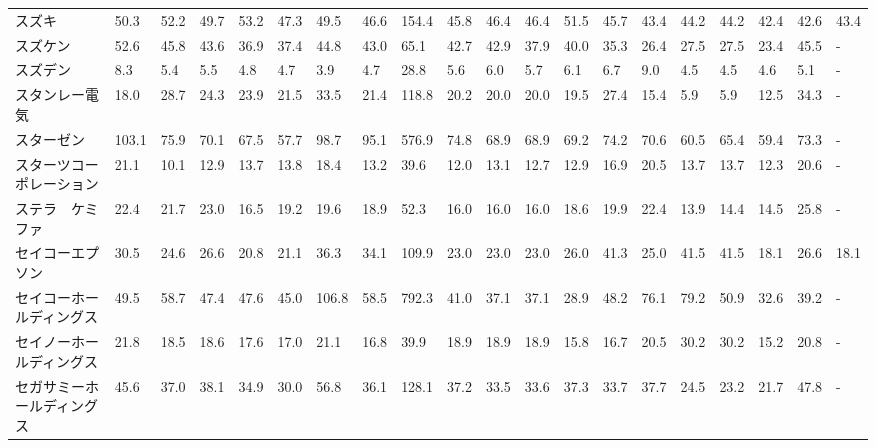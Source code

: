 \begin{longtable}[c]{lp{3mm}p{3mm}p{3mm}p{3mm}p{3mm}p{3mm}p{3mm}p{3mm}p{3mm}p{3mm}p{3mm}p{3mm}p{3mm}p{3mm}p{3mm}p{3mm}p{3mm}p{3mm}p{3mm}}
スズキ             &   50.3 &   52.2 &      49.7 &      53.2 &       47.3 &    49.5 &    46.6 &    154.4 &    45.8 &    46.4 &   46.4 &   51.5 &    45.7 &    43.4 &    44.2 &   44.2 &   42.4 &    42.6 &   43.4 \\
スズケン            &   52.6 &   45.8 &      43.6 &      36.9 &       37.4 &    44.8 &    43.0 &     65.1 &    42.7 &    42.9 &   37.9 &   40.0 &    35.3 &    26.4 &    27.5 &   27.5 &   23.4 &    45.5 &      - \\
スズデン            &    8.3 &    5.4 &       5.5 &       4.8 &        4.7 &     3.9 &     4.7 &     28.8 &     5.6 &     6.0 &    5.7 &    6.1 &     6.7 &     9.0 &     4.5 &    4.5 &    4.6 &     5.1 &      - \\
スタンレー電気         &   18.0 &   28.7 &      24.3 &      23.9 &       21.5 &    33.5 &    21.4 &    118.8 &    20.2 &    20.0 &   20.0 &   19.5 &    27.4 &    15.4 &     5.9 &    5.9 &   12.5 &    34.3 &      - \\
スターゼン           &  103.1 &   75.9 &      70.1 &      67.5 &       57.7 &    98.7 &    95.1 &    576.9 &    74.8 &    68.9 &   68.9 &   69.2 &    74.2 &    70.6 &    60.5 &   65.4 &   59.4 &    73.3 &      - \\
スターツコーポレーション    &   21.1 &   10.1 &      12.9 &      13.7 &       13.8 &    18.4 &    13.2 &     39.6 &    12.0 &    13.1 &   12.7 &   12.9 &    16.9 &    20.5 &    13.7 &   13.7 &   12.3 &    20.6 &      - \\
ステラ　ケミファ        &   22.4 &   21.7 &      23.0 &      16.5 &       19.2 &    19.6 &    18.9 &     52.3 &    16.0 &    16.0 &   16.0 &   18.6 &    19.9 &    22.4 &    13.9 &   14.4 &   14.5 &    25.8 &      - \\
セイコーエプソン        &   30.5 &   24.6 &      26.6 &      20.8 &       21.1 &    36.3 &    34.1 &    109.9 &    23.0 &    23.0 &   23.0 &   26.0 &    41.3 &    25.0 &    41.5 &   41.5 &   18.1 &    26.6 &   18.1 \\
セイコーホールディングス    &   49.5 &   58.7 &      47.4 &      47.6 &       45.0 &   106.8 &    58.5 &    792.3 &    41.0 &    37.1 &   37.1 &   28.9 &    48.2 &    76.1 &    79.2 &   50.9 &   32.6 &    39.2 &      - \\
セイノーホールディングス    &   21.8 &   18.5 &      18.6 &      17.6 &       17.0 &    21.1 &    16.8 &     39.9 &    18.9 &    18.9 &   18.9 &   15.8 &    16.7 &    20.5 &    30.2 &   30.2 &   15.2 &    20.8 &      - \\
セガサミーホールディングス   &   45.6 &   37.0 &      38.1 &      34.9 &       30.0 &    56.8 &    36.1 &    128.1 &    37.2 &    33.5 &   33.6 &   37.3 &    33.7 &    37.7 &    24.5 &   23.2 &   21.7 &    47.8 &      - \\

\end{longtable}
